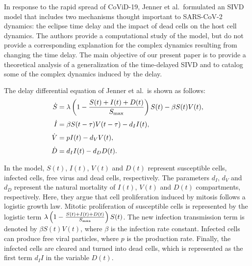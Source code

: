 \documentclass{CMHPhD-SIVD}
\begin{document}
In response to the rapid spread of CoViD-19, Jenner et al.\ formulated an SIVD model that includes two mechanisms thought important to SARS-CoV-2 dynamics: the eclipse time delay and the impact of dead cells on the host cell dynamics\cite{jenner2021covid}.
The authors provide a computational study of the model, but do not provide a corresponding explanation for the complex dynamics resulting from changing the time delay.   The main objective of our present paper is to provide a theoretical analysis of a generalization of the time-delayed SIVD and to catalog some of the complex dynamics induced by the delay.

The delay differential equation of Jenner et al.\ is shown as follows:
\begin{subequations}\label{SIVD-J}
   \begin{align}
		 \dot{S} &= \lambda\left(1-\frac{S(t)+I(t)+D(t)}{S_{\text{max}}}\right)S(t)-\beta S(t)V(t),
		 \label{SIVD-SJ}\\[3pt]
		 \dot{I} &= \beta S(t-\tau)V(t-\tau)-d_I I(t),
		 \label{SIVD-IJ}\\[3pt]
         \dot{V} &= pI(t)-d_V V(t),
		 \label{SIVD-VJ}\\[3pt]
		 \dot{D} &= d_I I(t)-d_D D(t).
		 \label{SIVD-DJ}
   \end{align}
\end{subequations}

In the model, $S(t)$, $I(t)$, $V(t)$ and $D(t)$ represent susceptible cells, infected cells, free virus and dead cells, respectively. The parameters $d_I$, $d_V$ and $d_D$ represent the natural mortality of $I(t)$, $V(t)$ and $D(t)$ compartments, respectively. Here, they argue that cell proliferation induced by mitosis follows a logistic growth law. Mitotic proliferation of susceptible cells is represented by the logistic term $\lambda\left(1-\frac{S(t)+I(t)+D(t)}{S_{\text{max}}}\right)S(t)$.  The new infection transmission term is denoted by $\beta S(t)V(t)$, where $\beta$ is the infection rate constant. Infected cells can produce free viral particles, where $p$ is the production rate. Finally, the infected cells are cleared and turned into dead cells, which is represented as the first term $d_I I$ in the variable $D(t)$.
\end{document}
